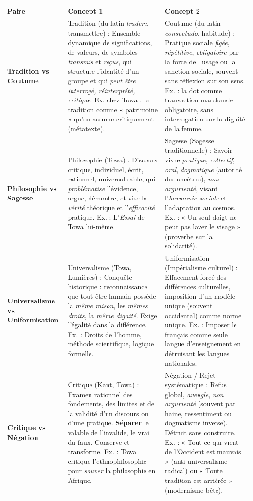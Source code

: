 \documentclass[11pt]{article}
\newcommand{\cle}[1]{{\popxbold\color{popdark}#1}}
\begin{document}
\begin{corrige}
\begin{center}
\begin{tabularx}{\linewidth}{|l|X|X|}
\hline
\rowcolor{popblueL}
\textbf{Paire} & \textbf{Concept 1} & \textbf{Concept 2} \\
\hline
\textbf{Tradition vs Coutume} &
\cle{Tradition} (du latin \emph{tradere}, transmettre) : Ensemble dynamique de significations, de valeurs, de symboles \emph{transmis} et \emph{reçus}, qui structure l'identité d'un groupe et qui \emph{peut être interrogé, réinterprété, critiqué}. Ex. chez Towa : la tradition comme « patrimoine » qu'on assume critique\-ment (métatexte). &
\cle{Coutume} (du latin \emph{consuetudo}, habitude) : Pratique sociale \emph{figée}, \emph{répétitive}, \emph{obligatoire} par la force de l'usage ou la sanction sociale, souvent sans réflexion sur son sens. Ex. : la dot comme transaction marchande obligatoire, sans interrogation sur la dignité de la femme. \\
\hline
\textbf{Philosophie vs Sagesse} &
\cle{Philosophie} (Towa) : \cle{Discours critique}, \cle{individuel}, \cle{écrit}, \cle{rationnel}, \cle{universalisable}, qui \emph{problématise} l'évidence, argue, démontre, et vise la \emph{vérité} théorique et l'\emph{efficacité} pratique. Ex. : L'\emph{Essai} de Towa lui-même. &
\cle{Sagesse} (Sagesse traditionnelle) : Savoir-vivre \emph{pratique}, \emph{collectif}, \emph{oral}, \emph{dogmatique} (autorité des ancêtres), \emph{non argumenté}, visant l'\emph{harmonie sociale} et l'adaptation au cosmos. Ex. : « Un seul doigt ne peut pas laver le visage » (proverbe sur la solidarité). \\
\hline
\textbf{Universalisme vs Uniformisation} &
\cle{Universalisme} (Towa, Lumières) : \cle{Conquête} historique : reconnaissance que tout être humain possède la \emph{même raison}, les \emph{mêmes droits}, la \emph{même dignité}. Exige l'égalité dans la différence. Ex. : Droits de l'homme, méthode scientifique, logique formelle. &
\cle{Uniformisation} (Impérialisme culturel) : \cle{Effacement} forcé des différences culturelles, imposition d'un modèle unique (souvent occidental) comme norme unique. Ex. : Imposer le français comme seule langue d'enseignement en détruisant les langues nationales. \\
\hline
\textbf{Critique vs Négation} &
\cle{Critique} (Kant, Towa) : \cle{Examen rationnel} des fondements, des limites et de la validité d'un discours ou d'une pratique. \textbf{Séparer} le valable de l'invalide, le vrai du faux. Conserve et transforme. Ex. : Towa critique l'ethnophilosophie pour \emph{sauver} la philosophie en Afrique. &
\cle{Négation / Rejet systématique} : \cle{Refus global}, \emph{aveugle}, \emph{non argumenté} (souvent par haine, ressentiment ou dogmatisme inverse). Détruit sans construire. Ex. : « Tout ce qui vient de l'Occident est mauvais » (anti-universalisme radical) ou « Toute tradition est arriérée » (modernisme bête). \\
\hline
\end{tabularx}
\end{center}
\end{corrige}
\end{document}
